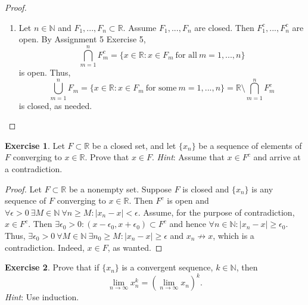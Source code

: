 \documentclass[12pt]{article}
\theoremstyle{definition}
\newtheorem{exercise}{Exercise}
\begin{document}
\begin{proof}
\begin{enumerate}[label=(\alph*)]
\[        \]
        is open. Thus,
        \[
            \bigcap_{\lambda \in \Lambda}F_{\lambda} = \{x \in \mathbb{R} : x \in F_{\lambda} \ \text{for all} \ \lambda \in \Lambda\} = \mathbb{R} \setminus \bigcup_{\lambda \in \Lambda}F_{\lambda}^c
        \]
        is closed, as needed.
        \item Let $n \in \mathbb{N}$ and $F_1,...,F_n \subset \mathbb{R}$. Assume $F_1,...,F_n$ are closed. Then $F_1^c,...,F_n^c$ are open. By Assignment 5 Exercise 5,
        \[
            \bigcap_{m = 1}^{n}F_{m}^c = \{x \in \mathbb{R} : x \in F_m \ \text{for all} \ m = 1,...,n\}
        \]
        is open. Thus,
        \[
            \bigcup_{m = 1}^{n}F_{m} = \{x \in \mathbb{R} : x \in F_{m} \ \text{for some} \ m = 1,...,n\} = \mathbb{R} \setminus \bigcap_{m = 1}^{n}F_m^c 
        \]
        is closed, as needed.
    \end{enumerate}
\end{proof}

\begin{exercise}
    Let $F \subset \mathbb{R}$ be a closed set, and let $\{x_n\}$ be a sequence of elements of $F$ converging to $x \in \mathbb{R}$. Prove that $x \in F$. \textit{Hint}: Assume that $x \in F^c$ and arrive at a contradiction.
\end{exercise}

\begin{proof}
    Let $F \subset \mathbb{R}$ be a nonempty set. Suppose $F$ is closed and $\{x_n\}$ is any sequence of $F$ converging to $x \in \mathbb{R}$. Then $F^c$ is open and $\forall \epsilon > 0 \ \exists M \in \mathbb{N} \ \forall n \geq M : \vert x_n - x \vert < \epsilon$. Assume, for the purpose of contradiction, $x \in F^c$. Then $\exists \epsilon_0 > 0 : (x - \epsilon_0, x + \epsilon_0) \subset F^c$ and hence $\forall n \in \mathbb{N} : \vert x_n - x \vert \geq \epsilon_0$. Thus, $\exists \epsilon_0 > 0 \ \forall M \in \mathbb{N} \ \exists n_0 \geq M : \vert x_n - x \vert \geq \epsilon$ and $x_n \not \to x$, which is a contradiction. Indeed, $x \in F$, as wanted.
\end{proof}

\begin{exercise}
    Prove that if $\{x_n\}$ is a convergent sequence, $k \in \mathbb{N}$, then
    \[
        \lim_{n \to \infty}x_n^k = \left(\lim_{n \to \infty}x_n\right)^k.
    \]
    \textit{Hint}: Use induction.
\end{exercise}
\end{document}
